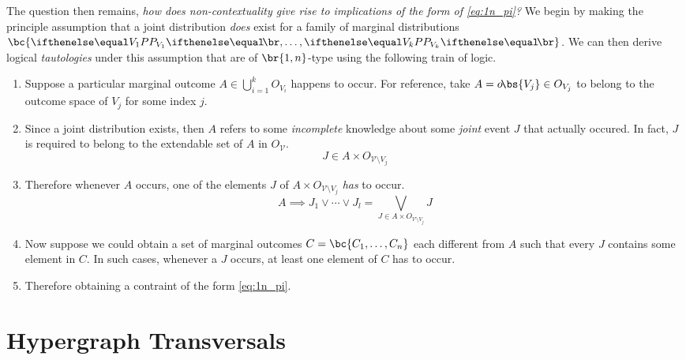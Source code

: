\documentclass[aps, 10pt, english, twoside, pra, nofootinbib, longbibliography]{revtex4-1}
\theoremstyle{plain}
\theoremstyle{definition}
\theoremstyle{remark}
\newcommand{\outc}[1]{o\!\bs{#1}}
\begin{document}
    The question then remains, \textit{how does non-contextuality give rise to implications of the form of \cref{eq:1n_pi}?} We begin by making the principle assumption that a joint distribution \textit{does} exist for a family of marginal distributions $\bc{\prob[V_1], \ldots, \prob[V_k]}$. We can then derive logical \textit{tautologies} under this assumption that are of $\br{1,n}$-type using the following train of logic.
    \begin{enumerate}
        \item Suppose a particular marginal outcome $A \in \bigcup_{i=1}^{k} O_{V_i}$ happens to occur. For reference, take $A = \outc{V_j} \in O_{V_j}$ to belong to the outcome space of $V_j$ for some index $j$.
        \item Since a joint distribution exists, then $A$ refers to some \textit{incomplete} knowledge about some \textit{joint} event $J$ that actually occured. In fact, $J$ is required to belong to the extendable set of $A$ in $O_{\mathcal{V}}$.
        \[ J \in A \times O_{\mathcal{V} \setminus V_j} \]
        \item Therefore whenever $A$ occurs, one of the elements $J$ of $A \times O_{\mathcal{V} \setminus V_j}$ \textit{has} to occur.
        \[ A \implies J_1 \vee \cdots \vee J_l = \bigvee_{J \in A \times O_{\mathcal{V} \setminus V_j}} J\]
        \item Now suppose we could obtain a set of marginal outcomes $C = \bc{C_1, \ldots, C_n}$ each different from $A$ such that every $J$ contains some element in $C$. In such cases, whenever a $J$ occurs, at least one element of $C$ has to occur.
        \item Therefore obtaining a contraint of the form \cref{eq:1n_pi}.
    \end{enumerate}



    \section{Hypergraph Transversals}
\end{document}
